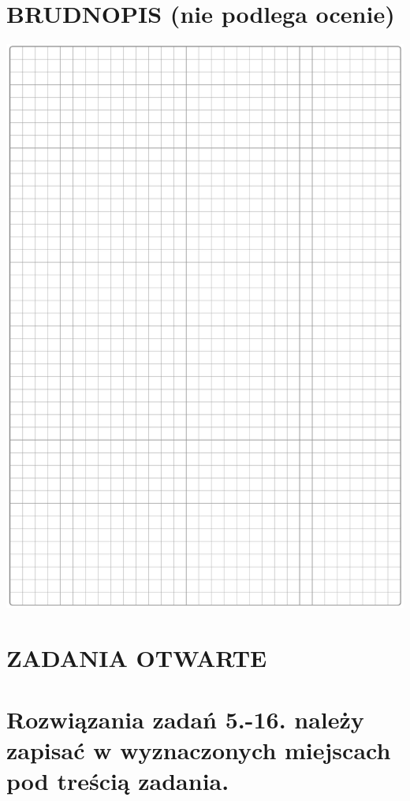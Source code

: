 \documentclass[10pt]{article}
\begin{document}
\section*{BRUDNOPIS (nie podlega ocenie)}
\begin{center}
\includegraphics[max width=\textwidth]{2024_11_21_e30d1f37bf0e3631c088g-03}
\end{center}

\section*{ZADANIA OTWARTE}
\section*{Rozwiązania zadań 5.-16. należy zapisać w wyznaczonych miejscach pod treścią zadania.}
\end{document}
